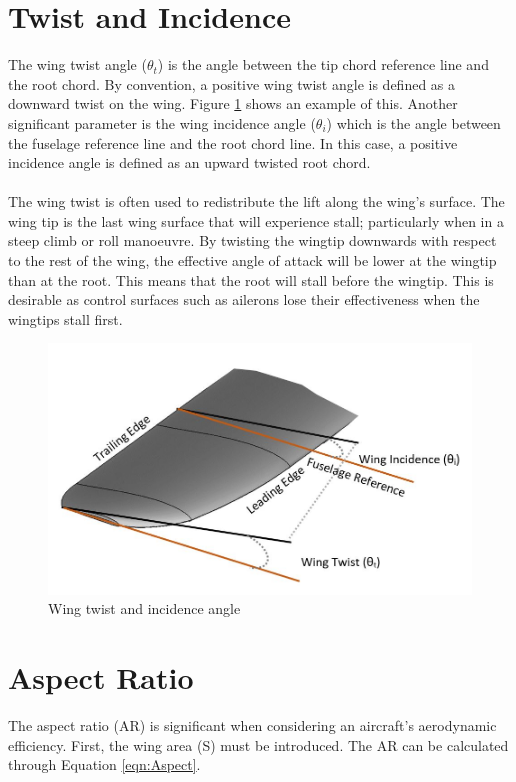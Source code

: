 \section{Twist and Incidence}
The wing twist angle ($\theta_t$) is the angle between the tip chord reference line and the root chord. By convention, a positive wing twist angle is defined as a downward twist on the wing. Figure \ref{fig:twist} shows an example of this. Another significant parameter is the wing incidence angle ($\theta_i$) which is the angle between the fuselage reference line and the root chord line. In this case, a positive incidence angle is defined as an upward twisted root chord. \\
\\
The wing twist is often used to redistribute the lift along the wing's surface. The wing tip is the last wing surface that will experience stall; particularly when in a steep climb or roll manoeuvre. By twisting the wingtip downwards with respect to the rest of the wing, the effective angle of attack will be lower at the wingtip than at the root. This means that the root will stall before the wingtip. This is desirable as control surfaces such as ailerons lose their effectiveness when the wingtips stall first. 


\begin{figure}[H]
  \centering
  \includegraphics[width=1\linewidth]{02_Background/Figs/wingo.JPG}
  \caption{Wing twist and incidence angle}
  \label{fig:twist}
\end{figure}

\section{Aspect Ratio}
The aspect ratio (AR) is significant when considering an aircraft's aerodynamic efficiency. First, the wing area (S) must be introduced. The AR can be calculated through Equation \ref{eqn:Aspect}.

